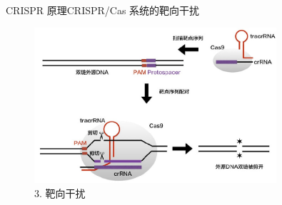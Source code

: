 \documentclass{beamer}
\begin{document}
\begin{frame}{CRISPR 原理}{CRISPR/Cas 系统的靶向干扰}
		
	\begin{figure}
		\centering
		\includegraphics[width=0.8\textwidth]{img/infect_stage3.jpeg}
		\caption{3. 靶向干扰}
	\end{figure}






\end{frame}

\end{document}
